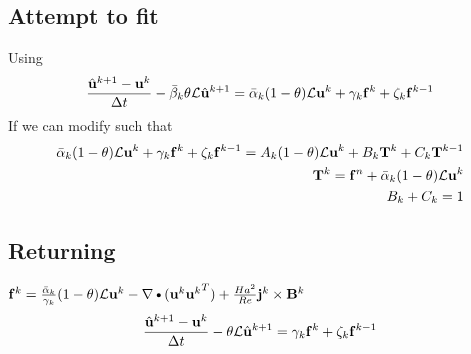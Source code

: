 \documentclass[11pt]{article}
\begin{document}
\subsection{Attempt to fit}
Using
\begin{equation}\begin{aligned}
\frac{\hat{\mathbf{u}}^{k+1}-\mathbf{u}^k}{\Delta t} - \bar{\beta}_k \theta \mathcal L \hat{\mathbf{u}}^{k+1} = \bar{\alpha}_k (1-\theta) \mathcal L \mathbf{u}^k + \gamma_k \mathbf{f}^k + \zeta_k \mathbf{f}^{k-1}  \\
\end{aligned} \end{equation}
If we can modify such that
\begin{equation}\begin{aligned}
\bar{\alpha}_k (1-\theta) \mathcal L \mathbf{u}^k + \gamma_k \mathbf{f}^k + \zeta_k \mathbf{f}^{k-1} = A_k (1-\theta) \mathcal L \mathbf{u}^k + B_k \mathbf{T}^k + C_k \mathbf{T}^{k-1}  \\
\mathbf{T}^k = \mathbf{f}^n + \bar{\alpha}_k (1-\theta)\mathcal L\mathbf{u}^k \\
B_k + C_k = 1
\end{aligned} \end{equation}









\subsection{Returning}
$\F^k = \frac{\bar{\alpha}_k}{\gamma_k} (1-\theta)\MAC L\U^k - \DEL \DOT (\U^k {\U^k}^T) + \frac{Ha^2}{Re} \J^k \CROSS \B^k$
\begin{equation}\begin{aligned}
\frac{\hat{\mathbf{u}}^{k+1}-\mathbf{u}^k}{\Delta t} - \theta \mathcal L \hat{\mathbf{u}}^{k+1} = \gamma_k \mathbf{f}^k + \zeta_k \mathbf{f}^{k-1}  \\
\end{aligned} \end{equation}
\end{document}
